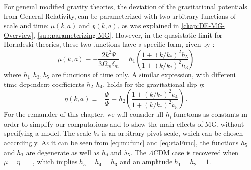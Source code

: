 For general modified gravity theories, the deviation
of the gravitational potentials from General Relativity,
can be parameterized with two arbitrary functions
of scale and time: $\mu(k,a)$ and $\eta(k,a)$,
as was explained in \cref{chap:DE-MG-Overview}, \cref{sub:parameterizing-MG}.
However, in the quasistatic limit for Horndeski theories, these two functions have a specific form, given by : 
\begin{equation}
\mu(k,a)\equiv-\frac{2k^{2}\Psi}{3\Omega_{m}\delta_{m}}=h_{1}\left(\frac{1+(k/k_{*})^{2}h_{5}}{1+(k/k_{*})^{2}h_{3}}\right)\label{eq:mufunc}
\end{equation}
where $h_{1},h_{3},h_{5}$ are functions of time only. A similar expression,
with different time dependent coefficients $h_{2},h_{4}$, holds for
the gravitational slip $\eta$: 
\begin{equation}
\eta(k,a)\equiv-\frac{\Phi}{\Psi}=h_{2}\left(\frac{1+(k/k_{*})^{2}h_{4}}{1+(k/k_{*})^{2}h_{5}}\right)\,.\label{eq:etaFunc}
\end{equation}
For the remainder of this chapter, we will consider all $h_{i}$ functions as constants in order to simplify our computations and to show the main effects of MG, without specifying
a model. The scale $k_{*}$ is an arbitrary pivot scale, which can be chosen accordingly.
As it can be seen from  \cref{eq:mufunc} and \cref{eq:etaFunc},
the functions $h_{5}$ and $h_{3}$ are degenerate as well as $h_{4}$
and $h_{5}$. The $\Lambda\textrm{CDM}$ case is recovered when $\mu=\eta=1$, which
implies $h_{5}=h_{4}=h_{3}$ and an amplitude $h_{1}=h_{2}=1$.

